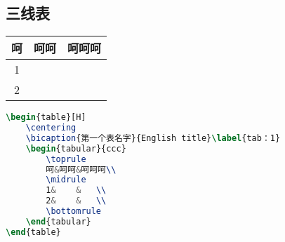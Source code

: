 \subsection{三线表}
\begin{table}[H]
	\centering
	\label{tab：1}
	\begin{tabular}{ccc}
		\toprule
		呵&呵呵&呵呵呵\\
		\midrule
		1&    &   \\
		2&    &   \\
		\bottomrule
	\end{tabular}
\end{table}
\begin{lstlisting}[language=TeX]
\begin{table}[H]
	\centering
	\bicaption{第一个表名字}{English title}\label{tab：1}
	\begin{tabular}{ccc}
		\toprule
		呵&呵呵&呵呵呵\\
		\midrule
		1&    &   \\
		2&    &   \\
		\bottomrule
	\end{tabular}
\end{table}
\end{lstlisting}

